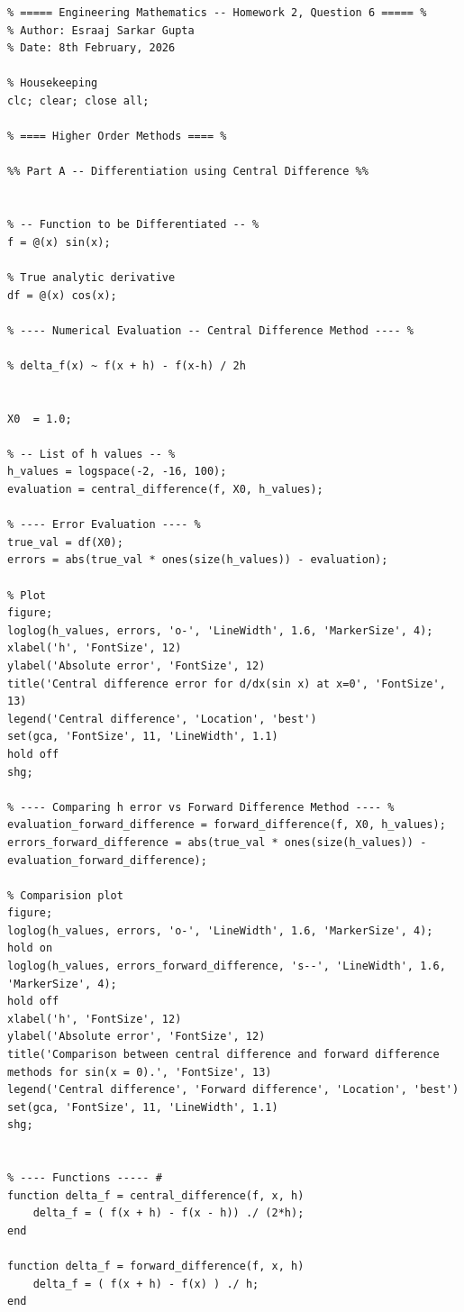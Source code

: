 \documentclass{article}
\begin{document}
\begin{lstlisting}
% ===== Engineering Mathematics -- Homework 2, Question 6 ===== %
% Author: Esraaj Sarkar Gupta
% Date: 8th February, 2026

% Housekeeping
clc; clear; close all;

% ==== Higher Order Methods ==== %

%% Part A -- Differentiation using Central Difference %%


% -- Function to be Differentiated -- %
f = @(x) sin(x);

% True analytic derivative
df = @(x) cos(x);

% ---- Numerical Evaluation -- Central Difference Method ---- %

% delta_f(x) ~ f(x + h) - f(x-h) / 2h


X0  = 1.0;

% -- List of h values -- %
h_values = logspace(-2, -16, 100);
evaluation = central_difference(f, X0, h_values);

% ---- Error Evaluation ---- %
true_val = df(X0);
errors = abs(true_val * ones(size(h_values)) - evaluation);

% Plot
figure;
loglog(h_values, errors, 'o-', 'LineWidth', 1.6, 'MarkerSize', 4);
xlabel('h', 'FontSize', 12)
ylabel('Absolute error', 'FontSize', 12)
title('Central difference error for d/dx(sin x) at x=0', 'FontSize', 13)
legend('Central difference', 'Location', 'best')
set(gca, 'FontSize', 11, 'LineWidth', 1.1)
hold off
shg;

% ---- Comparing h error vs Forward Difference Method ---- %
evaluation_forward_difference = forward_difference(f, X0, h_values);
errors_forward_difference = abs(true_val * ones(size(h_values)) - evaluation_forward_difference);

% Comparision plot
figure;
loglog(h_values, errors, 'o-', 'LineWidth', 1.6, 'MarkerSize', 4);
hold on
loglog(h_values, errors_forward_difference, 's--', 'LineWidth', 1.6, 'MarkerSize', 4);
hold off
xlabel('h', 'FontSize', 12)
ylabel('Absolute error', 'FontSize', 12)
title('Comparison between central difference and forward difference methods for sin(x = 0).', 'FontSize', 13)
legend('Central difference', 'Forward difference', 'Location', 'best')
set(gca, 'FontSize', 11, 'LineWidth', 1.1)
shg;


% ---- Functions ----- #
function delta_f = central_difference(f, x, h)
    delta_f = ( f(x + h) - f(x - h)) ./ (2*h);
end

function delta_f = forward_difference(f, x, h)
    delta_f = ( f(x + h) - f(x) ) ./ h;
end


\end{lstlisting}
\end{document}
